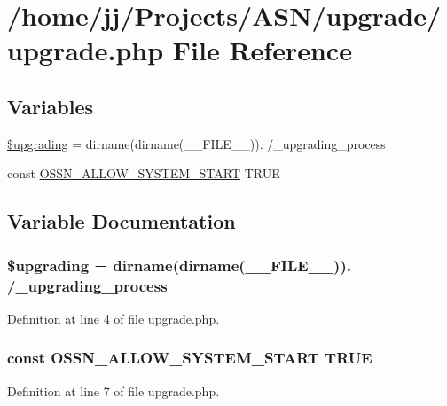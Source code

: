 \hypertarget{upgrade_8php}{}\section{/home/jj/\+Projects/\+A\+S\+N/upgrade/upgrade.php File Reference}
\label{upgrade_8php}
\subsection*{Variables}
\begin{DoxyCompactItemize}
\item 
\hyperlink{upgrade_8php_ad34fb6769729fe3c769518f63037207d}{\$upgrading} = dirname(dirname(\+\_\+\+\_\+\+F\+I\+L\+E\+\_\+\+\_\+)). \textquotesingle{}/\+\_\+upgrading\+\_\+process\textquotesingle{}
\item 
const \hyperlink{upgrade_8php_a73aeae1243c8451cb328ddfe84637175}{O\+S\+S\+N\+\_\+\+A\+L\+L\+O\+W\+\_\+\+S\+Y\+S\+T\+E\+M\+\_\+\+S\+T\+A\+RT} T\+R\+UE
\end{DoxyCompactItemize}


\subsection{Variable Documentation}
\subsubsection[{\texorpdfstring{\$upgrading}{$upgrading}}]{\setlength{\rightskip}{0pt plus 5cm}\$upgrading = dirname(dirname(\+\_\+\+\_\+\+F\+I\+L\+E\+\_\+\+\_\+)). \textquotesingle{}/\+\_\+upgrading\+\_\+process\textquotesingle{}}\hypertarget{upgrade_8php_ad34fb6769729fe3c769518f63037207d}{}\label{upgrade_8php_ad34fb6769729fe3c769518f63037207d}


Definition at line 4 of file upgrade.\+php.

\subsubsection[{\texorpdfstring{O\+S\+S\+N\+\_\+\+A\+L\+L\+O\+W\+\_\+\+S\+Y\+S\+T\+E\+M\+\_\+\+S\+T\+A\+RT}{OSSN_ALLOW_SYSTEM_START}}]{\setlength{\rightskip}{0pt plus 5cm}const O\+S\+S\+N\+\_\+\+A\+L\+L\+O\+W\+\_\+\+S\+Y\+S\+T\+E\+M\+\_\+\+S\+T\+A\+RT T\+R\+UE}\hypertarget{upgrade_8php_a73aeae1243c8451cb328ddfe84637175}{}\label{upgrade_8php_a73aeae1243c8451cb328ddfe84637175}


Definition at line 7 of file upgrade.\+php.


